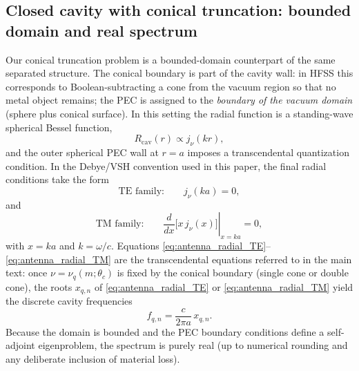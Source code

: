 \documentclass[
  aip,
  amsmath,amssymb,
  preprint
]{revtex4-1}
\begin{document}
\subsection{Closed cavity with conical truncation: bounded domain and real spectrum}
\label{sec:antenna:cavity}
Our conical truncation problem is a bounded-domain counterpart of the same separated structure. The conical boundary is part of the cavity wall: in HFSS this corresponds to Boolean-subtracting a cone from the vacuum region so that no metal object remains; the PEC is assigned to the \emph{boundary of the vacuum domain} (sphere plus conical surface). In this setting the radial function is a standing-wave spherical Bessel function,
\begin{equation}
\label{eq:antenna_radial_cavity}
R_{\mathrm{cav}}(r)\propto j_{\nu}(kr),
\end{equation}
and the outer spherical PEC wall at $r=a$ imposes a transcendental quantization condition. In the Debye/VSH convention used in this paper, the final radial conditions take the form
\begin{equation}
\label{eq:antenna_radial_TE}
\text{TE family:}\qquad j_{\nu}(ka)=0,
\end{equation}
and
\begin{equation}
\label{eq:antenna_radial_TM}
\text{TM family:}\qquad \left.\frac{d}{dx}\big[x\,j_{\nu}(x)\big]\right|_{x=ka}=0,
\end{equation}
with $x=ka$ and $k=\omega/c$. Equations \eqref{eq:antenna_radial_TE}--\eqref{eq:antenna_radial_TM} are the transcendental equations referred to in the main text: once $\nu=\nu_q(m;\theta_c)$ is fixed by the conical boundary (single cone or double cone), the roots $x_{q,n}$ of \eqref{eq:antenna_radial_TE} or \eqref{eq:antenna_radial_TM} yield the discrete cavity frequencies
\begin{equation}
\label{eq:antenna_freq_from_root}
f_{q,n}=\frac{c}{2\pi a}\,x_{q,n}.
\end{equation}
Because the domain is bounded and the PEC boundary conditions define a self-adjoint eigenproblem, the spectrum is purely real (up to numerical rounding and any deliberate inclusion of material loss).
\end{document}

